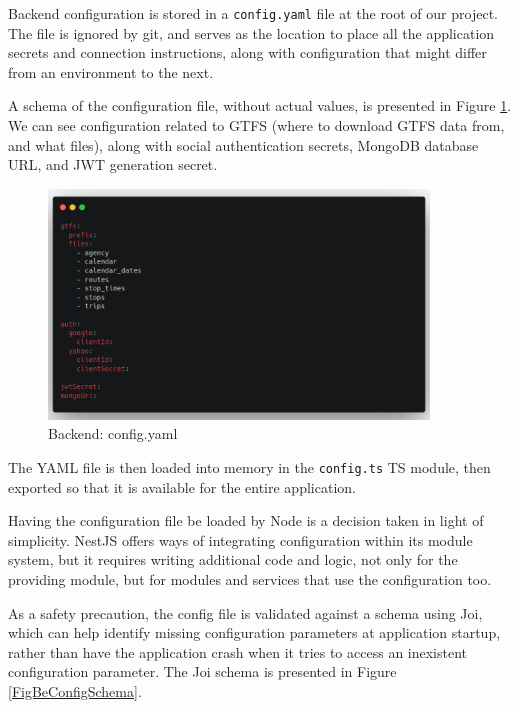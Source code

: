 Backend configuration is stored in a \verb|config.yaml| file at the root of our project. The file is ignored by git, and serves as the location to place all the application secrets and connection instructions, along with configuration that might differ from an environment to the next.

A schema of the configuration file, without actual values, is presented in Figure \ref{FigBeConfig}. We can see configuration related to GTFS (where to download GTFS data from, and what files), along with social authentication secrets, MongoDB database URL, and JWT generation secret.

\begin{figure}[htbp]
    \centering
    \includegraphics[width=0.9\textwidth]{./figures/code/be_config.png}
    \caption{Backend: config.yaml}
    \label{FigBeConfig}
\end{figure}

The YAML file is then loaded into memory in the \verb|config.ts| TS module, then exported so that it is available for the entire application.

Having the configuration file be loaded by Node is a decision taken in light of simplicity. NestJS offers ways of integrating configuration within its module system, but it requires writing additional code and logic, not only for the providing module, but for modules and services that use the configuration too.

As a safety precaution, the config file is validated against a schema using Joi, which can help identify missing configuration parameters at application startup, rather than have the application crash when it tries to access an inexistent configuration parameter. The Joi schema is presented in Figure \ref{FigBeConfigSchema}.

